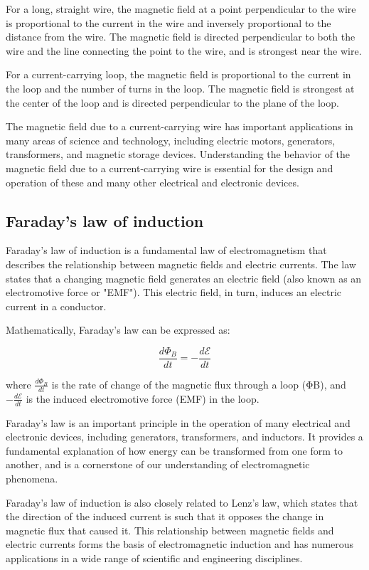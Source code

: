 \documentclass{article}
\begin{document}
For a long, straight wire, the magnetic field at a point perpendicular to the
wire is proportional to the current in the wire and inversely proportional to
the distance from the wire. The magnetic field is directed perpendicular to
both the wire and the line connecting the point to the wire, and is strongest
near the wire.

For a current-carrying loop, the magnetic field is proportional to the current
in the loop and the number of turns in the loop. The magnetic field is
strongest at the center of the loop and is directed perpendicular to the plane
of the loop.

The magnetic field due to a current-carrying wire has important applications in
many areas of science and technology, including electric motors, generators,
transformers, and magnetic storage devices. Understanding the behavior of the
magnetic field due to a current-carrying wire is essential for the design and
operation of these and many other electrical and electronic devices.
\subsection{Faraday’s law of induction} %
\label{ssub:Faraday’s law of induction}
Faraday's law of induction is a fundamental law of electromagnetism that
describes the relationship between magnetic fields and electric currents. The
law states that a changing magnetic field generates an electric field (also
known as an electromotive force or "EMF"). This electric field, in turn,
induces an electric current in a conductor.

Mathematically, Faraday's law can be expressed as:

\[\frac{d\Phi_B}{dt} = -\frac{d \mathcal{E}}{dt}\]

where $\frac{d\Phi_B}{dt}$ is the rate of change of the magnetic flux through a loop (ΦB), and
$-\frac{d \mathcal{E}}{dt}$ is the induced electromotive force (EMF) in the loop.

Faraday's law is an important principle in the operation of many electrical and
electronic devices, including generators, transformers, and inductors. It
provides a fundamental explanation of how energy can be transformed from one
form to another, and is a cornerstone of our understanding of electromagnetic
phenomena.

Faraday's law of induction is also closely related to Lenz's law, which states
that the direction of the induced current is such that it opposes the change in
magnetic flux that caused it. This relationship between magnetic fields and
electric currents forms the basis of electromagnetic induction and has numerous
applications in a wide range of scientific and engineering disciplines.
\end{document}
